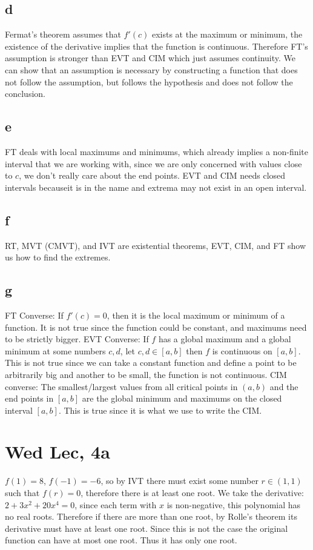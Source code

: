 \documentclass[12pt]{article}
\begin{document}
\subsection{d}
Fermat's theorem assumes that $f'(c)$ exists at the maximum or minimum, the existence of the derivative implies that the function is continuous. Therefore FT's assumption is stronger than EVT and CIM which just assumes continuity. We can show that an assumption is necessary by constructing a function that does not follow the assumption, but follows the hypothesis and does not follow the conclusion.

\subsection{e}
FT deals with local maximums and minimums, which already implies a non-finite interval that we are working with, since we are only concerned with values close to $c$, we don't really care about the end points. EVT and CIM needs closed intervals becauseit is in the name and extrema may not exist in an open interval.

\subsection{f}
RT, MVT (CMVT), and IVT are existential theorems, EVT, CIM, and FT show us how to find the extremes.

\subsection{g}
FT Converse: If $f'(c)=0$, then it is the local maximum or minimum of a function. It is not true since the function could be constant, and maximums need to be strictly bigger.
\newline
EVT Converse: If $f$ has a global maximum and a global minimum at some numbers $c,d$, let $c,d \in [a,b]$ then $f$ is continuous on $[a,b]$. This is not true since we can take a constant function and define a point to be arbitrarily big and another to be small, the function is not continuous.
\newline
CIM converse: The smallest/largest values from all critical points in $(a,b)$ and the end points in $[a,b]$ are the global minimum and maximums on the closed interval $[a,b]$. This is true since it is what we use to write the CIM.
\newpage


\section{Wed Lec, 4a}
$f(1)=8$, $f(-1)=-6$, so by IVT there must exist some number $r \in (1,1)$ such that $f(r)=0$, therefore there is at least one root.
\newline
We take the derivative: $2+3x^2+20x^4 = 0$, since each term with $x$ is non-negative, this polynomial has no real roots. Therefore if there are more than one root, by Rolle's theorem its derivative must have at least one root. Since this is not the case the original function can have at most one root.
\newline
Thus it has only one root.
\end{document}
